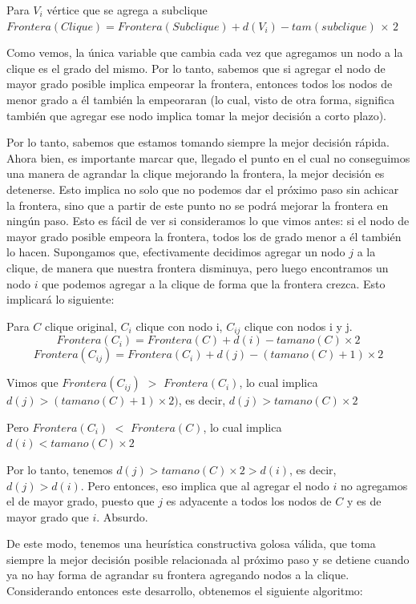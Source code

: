 \begin{center}
Para $V_i$ vértice que se agrega a subclique
$Frontera(Clique) = Frontera(Subclique) + d(V_i) - tam(subclique)$ $\times$ $2$
\end{center}

Como vemos, la única variable que cambia cada vez que agregamos un nodo a la clique es el grado del mismo. Por lo tanto, sabemos que si agregar el nodo de mayor grado posible implica empeorar la frontera, entonces todos los nodos de menor grado a él también la empeoraran (lo cual, visto de otra forma, significa también que agregar ese nodo implica tomar la mejor decisión a corto plazo).

Por lo tanto, sabemos que estamos tomando siempre la mejor decisión rápida. Ahora bien, es importante marcar que, llegado el punto en el cual no conseguimos una manera de agrandar la clique mejorando la frontera, la mejor decisión es detenerse. Esto implica no solo que no podemos dar el próximo paso sin achicar la frontera, sino que a partir de este punto no se podrá mejorar la frontera en ningún paso. Esto es fácil de ver si consideramos lo que vimos antes: si el nodo de mayor grado posible empeora la frontera, todos los de grado menor a él también lo hacen. Supongamos que, efectivamente decidimos agregar un nodo $j$ a la clique, de manera que nuestra frontera disminuya, pero luego encontramos un nodo $i$ que podemos agregar a la clique de forma que la frontera crezca. Esto implicará lo siguiente:

\begin{center}
Para $C$ clique original, $C_i$ clique con nodo i, $C_{ij}$ clique con nodos i y j.
$$Frontera(C_i) = Frontera(C) + d(i) - tamano(C) \times 2$$
$$Frontera(C_{ij}) = Frontera(C_i) + d(j) - (tamano(C) + 1) \times 2$$

Vimos que $Frontera(C_{ij})$ $>$ $Frontera(C_i)$, lo cual implica $d(j) > (tamano(C) + 1) \times 2)$, es decir, $d(j) > tamano(C) \times 2$

Pero $Frontera(C_i)$ $<$ $Frontera(C)$, lo cual implica $d(i) < tamano(C) \times 2$

Por lo tanto, tenemos $d(j) > tamano(C) \times 2 > d(i)$, es decir, $d(j) > d(i)$. Pero entonces, eso implica que al agregar el nodo $i$ no agregamos el de mayor grado, puesto que $j$ es adyacente a todos los nodos de $C$ y es de mayor grado que $i$. Absurdo.
\end{center}

De este modo, tenemos una heurística constructiva golosa válida, que toma siempre la mejor decisión posible relacionada al próximo paso y se detiene cuando ya no hay forma de agrandar su frontera agregando nodos a la clique. Considerando entonces este desarrollo, obtenemos el siguiente algoritmo:

